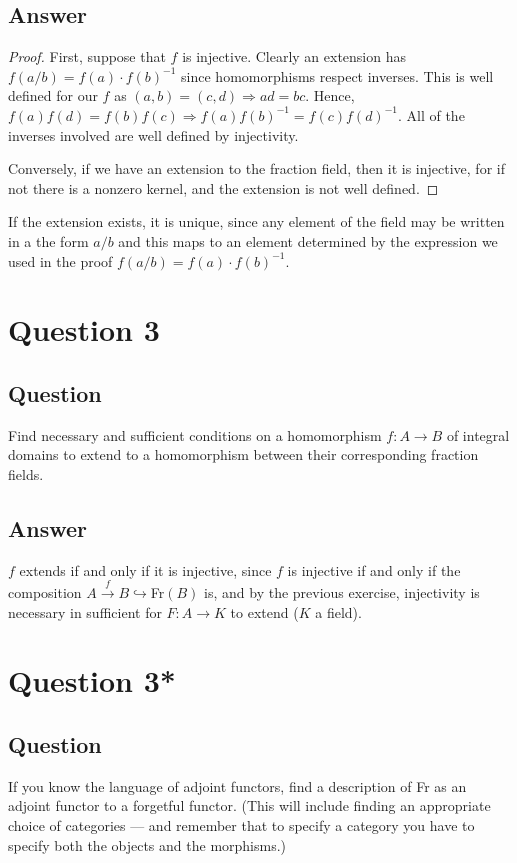 \documentclass[11pt]{article}
\begin{document}
\subsection{Answer}
\begin{proof}
First, suppose that $f$ is injective.  Clearly an extension has $f(a/b) = f(a)\cdot f(b)^{-1}$ since homomorphisms respect inverses. This is well defined for our $f$ as $(a,b) = (c,d) \Rightarrow ad=bc$. Hence, $f(a)f(d)=f(b)f(c) \Rightarrow f(a)f(b)^{-1} = f(c)f(d)^{-1}$. All of the inverses involved are well defined by injectivity.

Conversely, if we have an extension to the fraction field, then it is injective, for if not there is a nonzero kernel, and the extension is not well defined.
\end{proof}

If the extension exists, it is unique, since any element of the field may be written in a the form $a/b$ and this maps to an element determined by the expression we used in the proof $f(a/b) = f(a)\cdot f(b)^{-1}$.

\section{Question 3}
\subsection{Question}
Find necessary and sufficient conditions on a homomorphism $f: A \to B$ of integral domains to extend to a homomorphism between their corresponding fraction fields.
\subsection{Answer}

$f$ extends if and only if it is injective, since $f$ is injective if and only if the composition $A \stackrel{f}{\to} B \hookrightarrow $Fr$(B)$ is, and by the previous exercise,  injectivity is necessary in sufficient for $F: A \to K$ to extend ($K$ a field).

\section*{Question 3*}
\subsection{Question}
If you know the language of adjoint functors, find a description of Fr as an adjoint functor to a forgetful functor. (This will include finding an appropriate choice of categories --- and remember that to specify a category you have to specify both the objects and the morphisms.)
\end{document}
